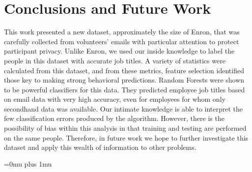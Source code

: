 \documentclass{article}
\begin{document}
\section{Conclusions and Future Work} \label{Conclusions}
This work presented a new dataset, approximately the size of Enron, that was carefully collected from volunteers' emails with particular attention to protect participant privacy.  Unlike Enron, we used our inside knowledge to label the people in this dataset with accurate job titles.  A variety of statistics were calculated from this dataset, and from these metrics, feature selection identified those key to making strong behavioral predictions.  Random Forests were shown to be powerful classifiers for this data.  They predicted employee job titles based on email data with very high accuracy, even for employees for whom only secondhand data was available.  Our intimate knowledge is able to interpret the few classification errors produced by the algorithm.  However, there is the possibility of bias within this analysis in that training and testing are performed on the same people.  Therefore, in future work we hope to further investigate this dataset and apply this wealth of information to other problems.


\clearpage
\Urlmuskip=0mu plus 1mu\relax


\end{document}
